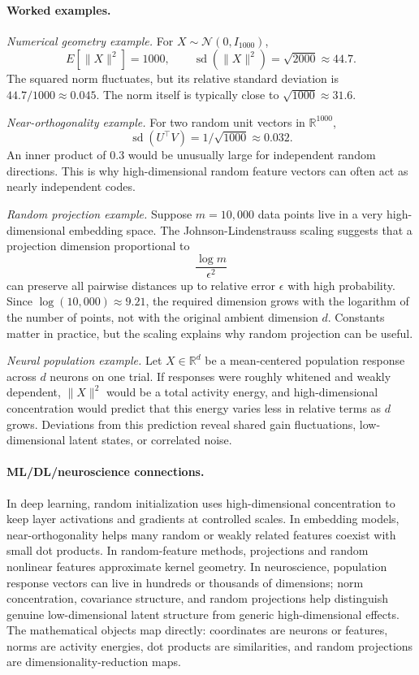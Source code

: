\paragraph{Worked examples.}
\emph{Numerical geometry example.}
For \(X\sim\mathcal N(0,I_{1000})\),
\[
E[\|X\|^2]=1000,
\qquad
\operatorname{sd}(\|X\|^2)=\sqrt{2000}\approx44.7.
\]
The squared norm fluctuates, but its relative standard deviation is \(44.7/1000\approx0.045\). The norm itself is typically close to \(\sqrt{1000}\approx31.6\).

\emph{Near-orthogonality example.}
For two random unit vectors in \(\mathbb R^{1000}\),
\[
\operatorname{sd}(U^\top V)=1/\sqrt{1000}\approx0.032.
\]
An inner product of \(0.3\) would be unusually large for independent random directions. This is why high-dimensional random feature vectors can often act as nearly independent codes.

\emph{Random projection example.}
Suppose \(m=10{,}000\) data points live in a very high-dimensional embedding space. The Johnson-Lindenstrauss scaling suggests that a projection dimension proportional to
\[
\frac{\log m}{\epsilon^2}
\]
can preserve all pairwise distances up to relative error \(\epsilon\) with high probability. Since \(\log(10{,}000)\approx9.21\), the required dimension grows with the logarithm of the number of points, not with the original ambient dimension \(d\). Constants matter in practice, but the scaling explains why random projection can be useful.

\emph{Neural population example.}
Let \(X\in\mathbb R^d\) be a mean-centered population response across \(d\) neurons on one trial. If responses were roughly whitened and weakly dependent, \(\|X\|^2\) would be a total activity energy, and high-dimensional concentration would predict that this energy varies less in relative terms as \(d\) grows. Deviations from this prediction reveal shared gain fluctuations, low-dimensional latent states, or correlated noise.

\paragraph{ML/DL/neuroscience connections.}
In deep learning, random initialization uses high-dimensional concentration to keep layer activations and gradients at controlled scales. In embedding models, near-orthogonality helps many random or weakly related features coexist with small dot products. In random-feature methods, projections and random nonlinear features approximate kernel geometry. In neuroscience, population response vectors can live in hundreds or thousands of dimensions; norm concentration, covariance structure, and random projections help distinguish genuine low-dimensional latent structure from generic high-dimensional effects. The mathematical objects map directly: coordinates are neurons or features, norms are activity energies, dot products are similarities, and random projections are dimensionality-reduction maps.


